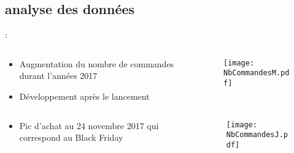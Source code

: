 \documentclass[8pt,aspectratio=169,hyperref={unicode=true}]{beamer}
\begin{document}
\subsection{analyse des données}
\begin{frame}{\insertsection: \insertsubsection}
    \begin{columns}
        \begin{column}{.5\textwidth}
            \begin{itemize}
                \item Augmentation du nombre de commandes durant l'années 2017
                \item Développement après le lancement
            \end{itemize}
        \end{column}
        \begin{column}{.5\textwidth}
            \begin{figure}
                \texttt{[image: NbCommandesM.pdf]}
            \end{figure}
        \end{column}
    \end{columns}
    \begin{columns}
        \begin{column}{.5\textwidth}
            \begin{itemize}
                \item Pic d'achat au 24 novembre 2017 qui correspond au Black Friday
            \end{itemize}
        \end{column}
        \begin{column}{.5\textwidth}
            \begin{figure}
                \texttt{[image: NbCommandesJ.pdf]}
            \end{figure}
        \end{column}
    \end{columns}
\end{frame}
\end{document}
